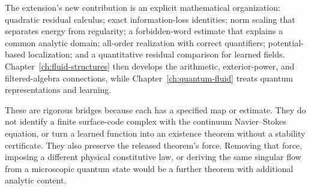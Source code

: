 The extension's new contribution is an explicit mathematical organization:
quadratic residual calculus; exact information-loss identities; norm
scaling that separates energy from regularity; a forbidden-word estimate
that explains a common analytic domain; all-order realization with
correct quantifiers; potential-based localization; and a quantitative
residual comparison for learned fields. Chapter~\ref{ch:fluid-structures}
then develops the arithmetic, exterior-power, and filtered-algebra
connections, while Chapter~\ref{ch:quantum-fluid} treats quantum
representations and learning.

These are rigorous bridges because each has a specified map or estimate.
They do not identify a finite surface-code complex with the continuum
Navier--Stokes equation, or turn a learned function into an existence
theorem without a stability certificate. They also preserve the released
theorem's force. Removing that force, imposing a different physical
constitutive law, or deriving the same singular flow from a microscopic
quantum state would be a further theorem with additional analytic content.
